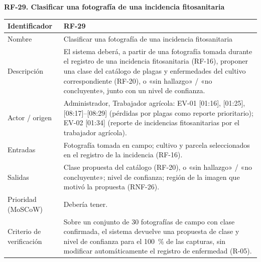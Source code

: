 \documentclass[12pt,a4paper]{article}
\begin{document}
\begin{minipage}{\linewidth}
\bigskip
\noindent\textbf{RF-29. Clasificar una fotografía de una incidencia fitosanitaria}
\label{tab:RF-29}

\begin{center}
\begin{tabular}{|p{3.5cm}|p{10.7cm}|}
\hline
Identificador & RF-29 \\
\hline
Nombre & Clasificar una fotografía de una incidencia fitosanitaria \\
\hline
Descripción & El sistema deberá, a partir de una fotografía tomada durante el registro de una incidencia fitosanitaria (RF-16), proponer una clase del catálogo de plagas y enfermedades del cultivo correspondiente (RF-20), o «sin hallazgo» / «no concluyente», junto con un nivel de confianza. \\
\hline
Actor / origen & Administrador, Trabajador agrícola: EV-01 [01:16], [01:25], [08:17]--[08:29] (pérdidas por plagas como reporte prioritario); EV-02 [01:34] (reporte de incidencias fitosanitarias por el trabajador agrícola). \\
\hline
Entradas & Fotografía tomada en campo; cultivo y parcela seleccionados en el registro de la incidencia (RF-16). \\
\hline
Salidas & Clase propuesta del catálogo (RF-20), o «sin hallazgo» / «no concluyente»; nivel de confianza; región de la imagen que motivó la propuesta (RNF-26). \\
\hline
Prioridad (MoSCoW) & Debería tener. \\
\hline
Criterio de verificación & Sobre un conjunto de 30 fotografías de campo con clase confirmada, el sistema devuelve una propuesta de clase y nivel de confianza para el 100~\% de las capturas, sin modificar automáticamente el registro de enfermedad (R-05). \\
\hline
\end{tabular}
\end{center}
\end{minipage}
\end{document}
